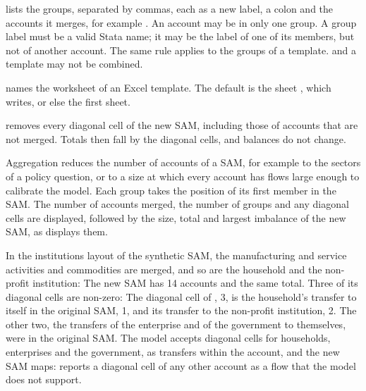 
\begin{optdesc}
\item[\optarg{}{groups}{spec}] lists the groups, separated by commas, each as
a new label, a colon and the accounts it merges, for example
{\frenchspacing{}}. An account may be in only one group. A group label
must be a valid Stata name; it may be the label of one of its members, but not
of another account. The same rule applies to the groups of a template.
 and a template may not be combined.

\item[\optarg{}{sheet}{string}] names the worksheet of an Excel template. The
default is the sheet , which  writes, or
else the first sheet.

\item[\opt{net}{diagonal}] removes every diagonal cell of the new SAM,
including those of accounts that are not merged. Totals then fall by the
diagonal cells, and balances do not change.
\end{optdesc}


Aggregation reduces the number of accounts of a SAM, for example to the
sectors of a policy question, or to a size at which every account has flows
large enough to calibrate the model. Each group takes the position of its
first member in the SAM. The number of accounts merged, the number of groups
and any diagonal cells are displayed, followed by the size, total and largest
imbalance of the new SAM, as  displays them.


In the institutions layout of the synthetic SAM, the manufacturing and service
activities and commodities are merged, and so are the household and the
non-profit institution:
The new SAM has 14 accounts and the same total. Three of its diagonal cells are
non-zero:
The diagonal cell of , 3, is the household's transfer to itself in the
original SAM, 1, and its transfer to the non-profit institution, 2. The other
two, the transfers of the enterprise and of the government to themselves, were
in the original SAM. The model accepts diagonal cells for households,
enterprises and the government, as transfers within the account, and the new
SAM maps:
 reports a diagonal cell of any other account as a flow that
the model does not support.

